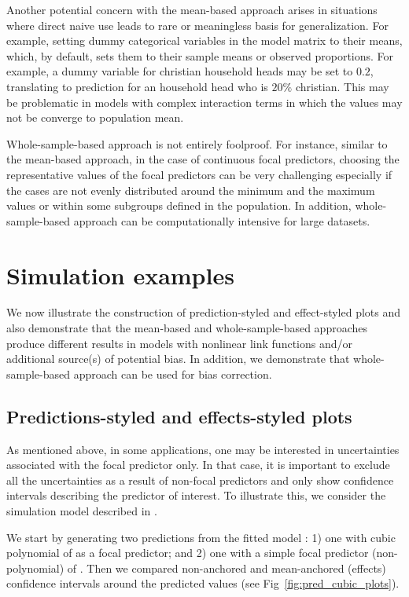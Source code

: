 Another potential concern with the mean-based approach arises in situations where direct naive use leads to rare or meaningless basis for generalization. For example, setting dummy categorical variables in the model matrix to their means, which, by default, sets them to their sample means or observed proportions. For example, a dummy variable for christian household heads may be set to $0.2$, translating to prediction for an household head who is $20\%$ christian. This may be problematic in models with complex interaction terms in which the values may not be converge to population mean\citep{hanmer2013behind}.

Whole-sample-based approach is not entirely foolproof. For instance, similar to the mean-based approach, in the case of continuous focal predictors, choosing the representative values of the focal predictors can be very challenging especially if the cases are not evenly distributed around the minimum and the maximum values or within some subgroups defined in the population. In addition, whole-sample-based approach can be computationally intensive for large datasets.

\section{Simulation examples}

We now illustrate the construction of prediction-styled and effect-styled plots and also demonstrate that the mean-based and whole-sample-based approaches produce different results in models with nonlinear link functions and/or additional source(s) of potential bias. In addition, we demonstrate that whole-sample-based approach can be used for bias correction.

\subsection{Predictions-styled and effects-styled plots}

As mentioned above, in some applications, one may be interested in uncertainties associated with the focal predictor only. In that case, it is important to exclude all the uncertainties as a result of non-focal predictors and only show confidence intervals describing the predictor of interest. To illustrate this, we consider the simulation model described in . 

We start by generating two predictions from the fitted model : 1) one with cubic polynomial of  as a focal predictor; and 2) one with a simple focal predictor (non-polynomial) of . Then we compared non-anchored and mean-anchored (effects) confidence intervals around the predicted values (see Fig~\ref{fig:pred_cubic_plots}).


